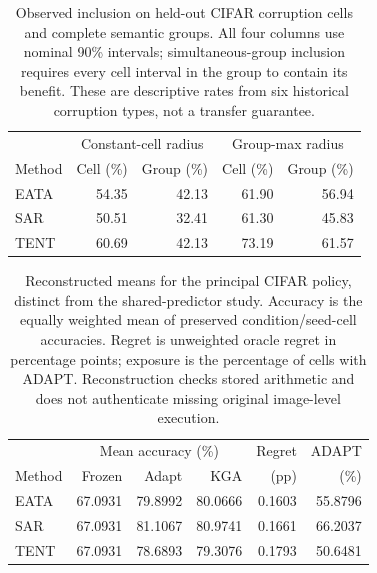 \begin{table}[tb]
\centering\small
\caption{Observed inclusion on held-out CIFAR corruption cells and complete semantic groups. All four columns use nominal 90\% intervals; simultaneous-group inclusion requires every cell interval in the group to contain its benefit. These are descriptive rates from six historical corruption types, not a transfer guarantee.}
\label{tab:journal-inclusion-units}
\begin{tabular}{lrrrr}
\toprule
& \multicolumn{2}{c}{Constant-cell radius} & \multicolumn{2}{c}{Group-max radius} \\
Method & Cell (\%) & Group (\%) & Cell (\%) & Group (\%) \\
\midrule
EATA & 54.35 & 42.13 & 61.90 & 56.94 \\
SAR & 50.51 & 32.41 & 61.30 & 45.83 \\
TENT & 60.69 & 42.13 & 73.19 & 61.57 \\
\bottomrule
\end{tabular}
\end{table}

\begin{table}[tb]
\centering\small
\caption{Reconstructed means for the principal CIFAR policy, distinct from the shared-predictor study. Accuracy is the equally weighted mean of preserved condition/seed-cell accuracies. Regret is unweighted oracle regret in percentage points; exposure is the percentage of cells with ADAPT. Reconstruction checks stored arithmetic and does not authenticate missing original image-level execution.}
\label{tab:journal-principal-means}
\begin{tabular}{lrrrrr}
\toprule
& \multicolumn{3}{c}{Mean accuracy (\%)} & Regret & ADAPT \\
Method & Frozen & Adapt & KGA & (pp) & (\%) \\
\midrule
EATA & 67.0931 & 79.8992 & 80.0666 & 0.1603 & 55.8796 \\
SAR & 67.0931 & 81.1067 & 80.9741 & 0.1661 & 66.2037 \\
TENT & 67.0931 & 78.6893 & 79.3076 & 0.1793 & 50.6481 \\
\bottomrule
\end{tabular}
\end{table}


